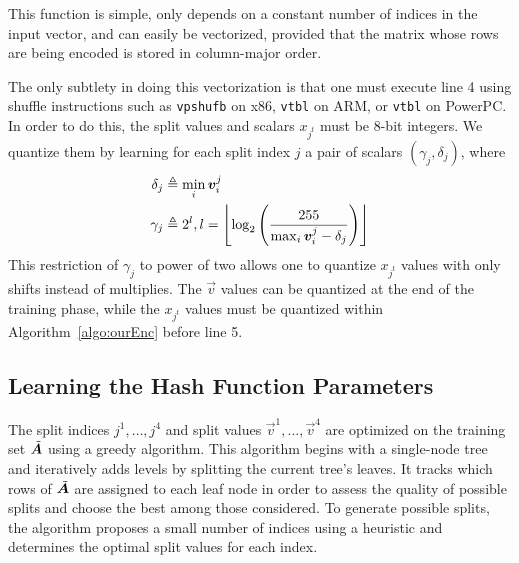 This function is simple, only depends on a constant number of indices in the input vector, and can easily be vectorized, provided that the matrix whose rows are being encoded is stored in column-major order.

The only subtlety in doing this vectorization is that one must execute line 4 using shuffle instructions such as \texttt{vpshufb} on x86, \texttt{vtbl} on ARM, or \texttt{vtbl} on PowerPC. In order to do this, the split values and scalars $x_{j^t}$ must be 8-bit integers. We quantize them by learning for each split index $j$ a pair of scalars $(\gamma_j, \delta_j)$, where
\begin{align}
    \delta_j &\triangleq \min_i \bm{v}^j_i \\
    \gamma_j &\triangleq 2^l, l = \left \lfloor  \log_2 \left( \frac{255}{\max_i \bm{v}^j_i - \delta_j} \right)  \right \rfloor
\end{align}
This restriction of $\gamma_j$ to power of two allows one to quantize $x_{j^t}$ values with only shifts instead of multiplies. The $\vec{v}$ values can be quantized at the end of the training phase, while the $x_{j^t}$ values must be quantized within Algorithm~\ref{algo:ourEnc} before line 5.%

\subsection{Learning the Hash Function Parameters}

The split indices ${j^1,\ldots,j^4}$ and split values $\vec{v}^1,\ldots,\vec{v}^4$ are optimized on the training set $\tilde{\bm{A}}$ using a greedy algorithm. This algorithm begins with a single-node tree and iteratively adds levels by splitting the current tree's leaves. It tracks which rows of $\tilde{\bm{A}}$ are assigned to each leaf node in order to assess the quality of possible splits and choose the best among those considered. To generate possible splits, the algorithm proposes a small number of indices using a heuristic and determines the optimal split values for each index.%

